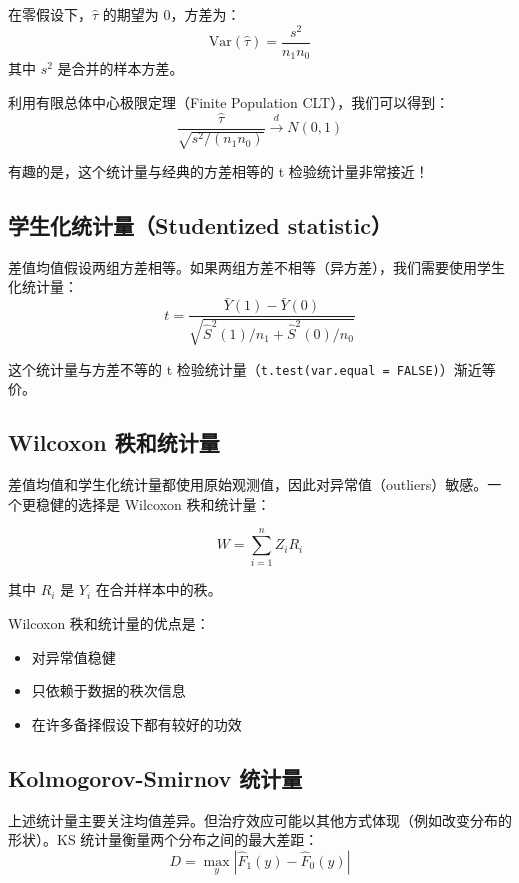 在零假设下，$\hat{\tau}$ 的期望为 0，方差为：
\[
\text{Var}(\hat{\tau}) = \frac{s^2}{n_1 n_0}
\]
其中 $s^2$ 是合并的样本方差。

利用有限总体中心极限定理（Finite Population CLT），我们可以得到：
\[
\frac{\hat{\tau}}{\sqrt{s^2/(n_1 n_0)}} \xrightarrow{d} N(0, 1)
\]

有趣的是，这个统计量与经典的方差相等的 t 检验统计量非常接近！

\subsection{学生化统计量（Studentized statistic）}

差值均值假设两组方差相等。如果两组方差不相等（异方差），我们需要使用学生化统计量：
\[
t = \frac{\bar{Y}(1) - \bar{Y}(0)}{\sqrt{\hat{S}^2(1)/n_1 + \hat{S}^2(0)/n_0}}
\]

这个统计量与方差不等的 t 检验统计量（\texttt{t.test(var.equal = FALSE)}）渐近等价。


\subsection{Wilcoxon 秩和统计量}

差值均值和学生化统计量都使用原始观测值，因此对异常值（outliers）敏感。一个更稳健的选择是 Wilcoxon 秩和统计量：

\[
W = \sum_{i=1}^n Z_i R_i
\]

其中 $R_i$ 是 $Y_i$ 在合并样本中的秩。

Wilcoxon 秩和统计量的优点是：
\begin{itemize}
  \item 对异常值稳健
  \item 只依赖于数据的秩次信息
  \item 在许多备择假设下都有较好的功效
\end{itemize}

\subsection{Kolmogorov-Smirnov 统计量}

上述统计量主要关注均值差异。但治疗效应可能以其他方式体现（例如改变分布的形状）。KS 统计量衡量两个分布之间的最大差距：
\[
D = \max_y |\hat{F}_1(y) - \hat{F}_0(y)|
\]

